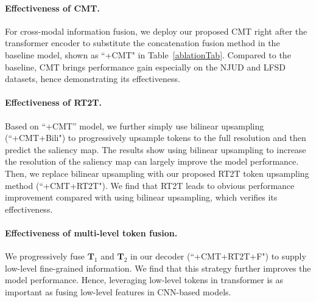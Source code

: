 \documentclass[10pt,twocolumn,letterpaper]{article}
\begin{document}
\vspace{-3mm}
\paragraph{Effectiveness of CMT.}
For cross-modal information fusion, we deploy our proposed CMT right after the transformer encoder to substitute the concatenation fusion method in the baseline model, shown as ``+CMT" in Table~\ref{ablationTab}.
Compared to the baseline, CMT brings performance gain especially on the NJUD and LFSD datasets, hence demonstrating its effectiveness.

\vspace{-3mm}
\paragraph{Effectiveness of RT2T.}
Based on ``+CMT'' model, we further simply use bilinear upsampling (``+CMT+Bili") to progressively upsample tokens to the full resolution and then predict the saliency map.
The results show using bilinear upsampling to increase the resolution of the saliency map can largely improve the model performance.
Then, we replace bilinear upsampling with our proposed RT2T token upsampling method (``+CMT+RT2T"). We find that RT2T leads to obvious performance improvement compared with using bilinear upsampling, which verifies its effectiveness. 

\vspace{-3mm}
\paragraph{Effectiveness of multi-level token fusion.}
We progressively fuse $\bm{T}_1$ and $\bm{T}_2$ in our decoder (``+CMT+RT2T+F") to supply low-level fine-grained information. We find that this strategy further improves the model performance. Hence, leveraging low-level tokens in transformer is as important as fusing low-level features in CNN-based models.
\end{document}
